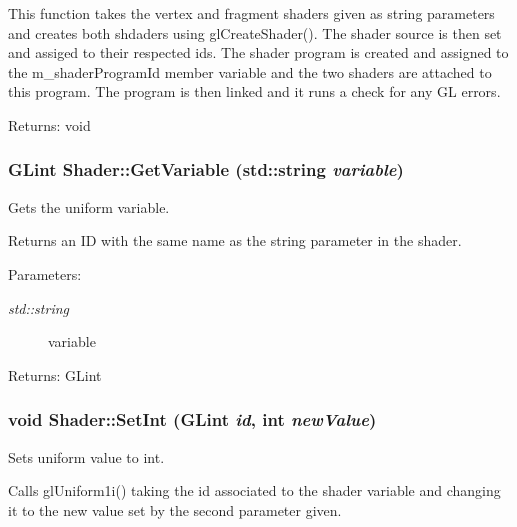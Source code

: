 This function takes the vertex and fragment shaders given as string parameters and creates both shdaders using glCreateShader(). The shader source is then set and assiged to their respected ids. The shader program is created and assigned to the m\_\-shaderProgramId member variable and the two shaders are attached to this program. The program is then linked and it runs a check for any GL errors.

\begin{Desc}
\item[Returns:]void \end{Desc}
\hypertarget{class_shader_1230582b9f5d71bde3614683244e1a83}{
\subsubsection[GetVariable]{\setlength{\rightskip}{0pt plus 5cm}GLint Shader::GetVariable (std::string {\em variable})}}
\label{class_shader_1230582b9f5d71bde3614683244e1a83}


Gets the uniform variable. 

Returns an ID with the same name as the string parameter in the shader.

\begin{Desc}
\item[Parameters:]
\begin{description}
\item[{\em std::string}]variable \end{description}
\end{Desc}
\begin{Desc}
\item[Returns:]GLint \end{Desc}
\hypertarget{class_shader_3287589cdac47466a201e2d6702280ee}{
\subsubsection[SetInt]{\setlength{\rightskip}{0pt plus 5cm}void Shader::SetInt (GLint {\em id}, \/  int {\em newValue})}}
\label{class_shader_3287589cdac47466a201e2d6702280ee}


Sets uniform value to int. 

Calls glUniform1i() taking the id associated to the shader variable and changing it to the new value set by the second parameter given.

